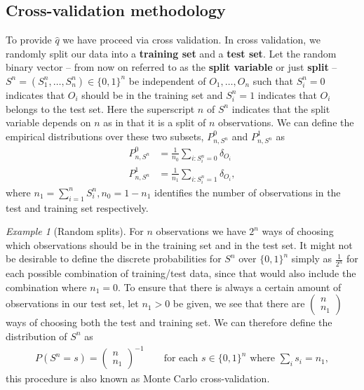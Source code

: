 \documentclass[11pt, a4paper]{article}
\theoremstyle{definition}
\theoremstyle{remark}
\newtheorem{example}{Example}
\newcommand{\q}{q}
\newcommand{\Sn}{S^n}
\begin{document}
\subsection{Cross-validation methodology}
To provide $ \hat{\q} $ we have proceed via cross validation. In cross validation, we randomly split our data into a \textbf{training set} and a \textbf{test set}. Let the random binary vector -- from now on referred to as the \textbf{split variable} or just \textbf{split} -- $ \Sn = (\Sn_1,\ldots,\Sn_n) \in \{0,1\}^{n} $ be independent of $ O_1,\ldots, O_n $ such that $ \Sn_i = 0 $ indicates that $ O_i $ should be in the training set and $ \Sn_i = 1 $ indicates that $ O_i $ belongs to the test set. Here the superscript $ n $ of $ \Sn $ indicates that the split variable depends on $ n $ as in that it is a split of $ n $ observations. We can define the empirical distributions over these two subsets, $ P_{n,\Sn}^0$ and $ P_{n,\Sn}^{1} $ as
\begin{align*}
    P_{n,\Sn}^{0} &= \frac{1}{n_0} \sum_{i: \Sn_i = 0} \delta_{O_i} \\
    P_{n,\Sn}^{1} &= \frac{1}{n_1} \sum_{i: \Sn_i = 1} \delta_{O_i},
\end{align*}
where $ n_1 = \sum_{i = 1}^{n} \Sn_i, n_0 = 1-n_1$ identifies the number of observations in the test and training set respectively.

\begin{example}[Random splits] \label{splits}
   For $ n $ observations we have $ 2^{n} $ ways of choosing which observations should be in the training set and in the test set. It might not be desirable to define the discrete probabilities for $ \Sn $ over $ \{0,1\}^{n} $ simply as $ \frac{1}{2^{n}} $ for each possible combination of training/test data, since that would also include the combination where $ n_1 = 0 $. To ensure that there is always a certain amount of observations in our test set, let $ n_1 > 0 $ be given, we see that there are $ \begin{pmatrix}
        n \\ n_1
    \end{pmatrix}$ ways of choosing both the test and training set. We can therefore define the distribution of $ \Sn $ as 
    \begin{align*}
        P \left(\Sn = s \right) = \begin{pmatrix}
            n \\ n_1
    \end{pmatrix}^{-1} \qquad \text{for each } s \in \{0,1\}^{n} \text{ where } \sum_{i} s_i = n_1,
    \end{align*}
    this procedure is also known as Monte Carlo cross-validation.
\end{example}
\end{document}
